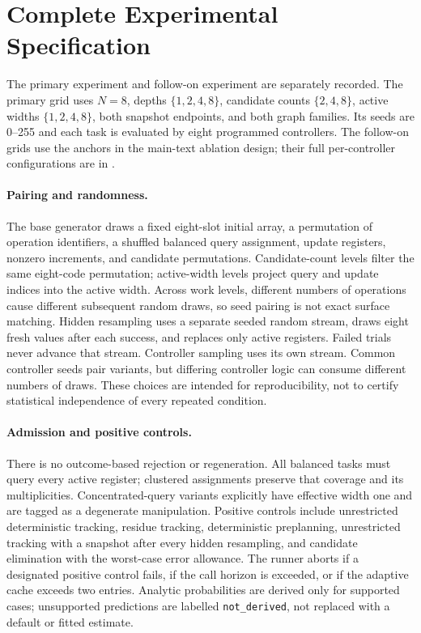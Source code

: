 \section{Complete Experimental Specification}
\label{app:specification}
The primary experiment and follow-on experiment are separately recorded.
The primary grid uses $N=8$, depths $\{1,2,4,8\}$, candidate counts
$\{2,4,8\}$, active widths $\{1,2,4,8\}$, both snapshot endpoints, and
both graph families. Its seeds are 0--255 and each task is evaluated by
eight programmed controllers. The follow-on grids use the anchors
in the main-text ablation design; their full per-controller configurations
are in .

\paragraph{Pairing and randomness.}
The base generator draws a fixed eight-slot initial array, a permutation
of operation identifiers, a shuffled balanced query assignment, update
registers, nonzero increments, and candidate permutations. Candidate-count
levels filter the same eight-code permutation; active-width levels project
query and update indices into the active width. Across work levels, different
numbers of operations cause different subsequent random draws, so seed
pairing is not exact surface matching. Hidden resampling uses a separate
seeded random stream, draws eight fresh values after each success, and
replaces only active registers. Failed trials never advance that stream.
Controller sampling uses its own stream. Common controller seeds pair
variants, but differing controller logic can consume different numbers
of draws. These choices are intended for reproducibility, not to certify
statistical independence of every repeated condition.

\paragraph{Admission and positive controls.}
There is no outcome-based rejection or regeneration. All balanced tasks
must query every active register; clustered assignments preserve that
coverage and its multiplicities. Concentrated-query variants explicitly
have effective width one and are tagged as a degenerate manipulation.
Positive controls include unrestricted deterministic tracking, residue
tracking, deterministic preplanning, unrestricted tracking with a snapshot
after every hidden resampling, and candidate elimination with the worst-case
error allowance. The runner aborts if a designated positive control fails,
if the call horizon is exceeded, or if the adaptive cache exceeds two
entries. Analytic probabilities are derived only for supported cases;
unsupported predictions are labelled \texttt{not\_derived}, not replaced
with a default or fitted estimate.

